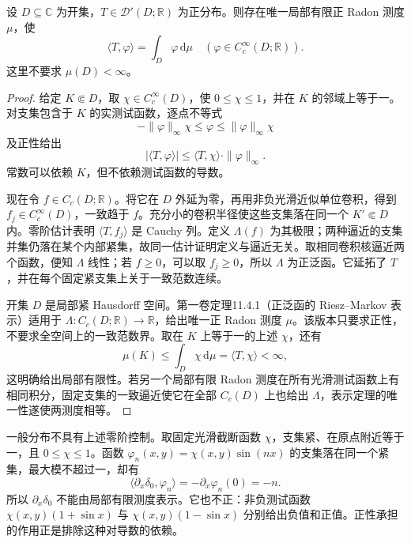 \begin{proposition}[正分布的测度表示]\label{b3:prop:15-positive-distribution}
设 \(D\subseteq\mathbb C\) 为开集，\(T\in\mathcal D'(D;\mathbb R)\) 为正分布。则存在唯一局部有限正 Radon 测度 \(\mu\)，使
\[
 \langle T,\varphi\rangle=\int_D\varphi\,\mathrm{d}\mu
 \quad\left(\varphi\in C_c^\infty(D;\mathbb R)\right).
\]
这里不要求 \(\mu(D)<\infty\)。
\end{proposition}
\begin{proof}
给定 \(K\Subset D\)，取 \(\chi\in C_c^\infty(D)\)，使 \(0\le\chi\le1\)，并在 \(K\) 的邻域上等于一。对支集包含于 \(K\) 的实测试函数，逐点不等式
\[
 -\|\varphi\|_\infty\chi\le\varphi\le\|\varphi\|_\infty\chi
\]
及正性给出
\[
 |\langle T,\varphi\rangle|
 \le\langle T,\chi\rangle\cdot\|\varphi\|_\infty.
\]
常数可以依赖 \(K\)，但不依赖测试函数的导数。

现在令 \(f\in C_c(D;\mathbb R)\)。将它在 \(D\) 外延为零，再用非负光滑近似单位卷积，得到 \(f_j\in C_c^\infty(D)\)，一致趋于 \(f\)。充分小的卷积半径使这些支集落在同一个 \(K'\Subset D\) 内。零阶估计表明 \(\langle T,f_j\rangle\) 是 Cauchy 列。定义 \(\Lambda(f)\) 为其极限；两种逼近的支集并集仍落在某个内部紧集，故同一估计证明定义与逼近无关。取相同卷积核逼近两个函数，便知 \(\Lambda\) 线性；若 \(f\ge0\)，可以取 \(f_j\ge0\)，所以 \(\Lambda\) 为正泛函。它延拓了 \(T\)，并在每个固定紧支集上关于一致范数连续。

开集 \(D\) 是局部紧 Hausdorff 空间。第一卷定理11.4.1（正泛函的 Riesz--Markov 表示）适用于 \(\Lambda:C_c(D;\mathbb R)\rightarrow\mathbb R\)，给出唯一正 Radon 测度 \(\mu\)。该版本只要求正性，不要求全空间上的一致范数界。取在 \(K\) 上等于一的上述 \(\chi\)，还有
\[
 \mu(K)\le\int_D\chi\,\mathrm{d}\mu=\langle T,\chi\rangle<\infty,
\]
这明确给出局部有限性。若另一个局部有限 Radon 测度在所有光滑测试函数上有相同积分，固定支集的一致逼近使它在全部 \(C_c(D)\) 上也给出 \(\Lambda\)，表示定理的唯一性遂使两测度相等。
\end{proof}

一般分布不具有上述零阶控制。取固定光滑截断函数 \(\chi\)，支集紧、在原点附近等于一，且 \(0\le\chi\le1\)。函数 \(\varphi_n(x,y)=\chi(x,y)\sin(nx)\) 的支集落在同一个紧集，最大模不超过一，却有
\[
 \langle\partial_x\delta_0,\varphi_n\rangle
 =-\partial_x\varphi_n(0)=-n.
\]
所以 \(\partial_x\delta_0\) 不能由局部有限测度表示。它也不正：非负测试函数 \(\chi(x,y)(1+\sin x)\) 与 \(\chi(x,y)(1-\sin x)\) 分别给出负值和正值。正性承担的作用正是排除这种对导数的依赖。

